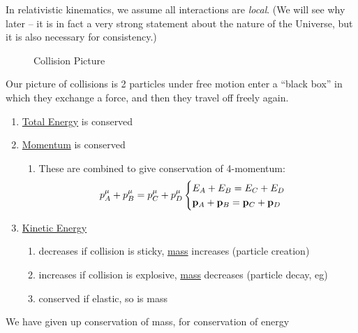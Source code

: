 In relativistic kinematics, we assume all interactions are \emph{local}. (We will see why later -- it is in fact a very strong statement about the nature of the Universe, but it is also necessary for consistency.)

\begin{figure}[H]
  \centering
  \caption{Collision Picture}
\end{figure}

Our picture of collisions is 2 particles under free motion enter a ``black box'' in which they exchange a force, and then they travel off freely again.

\begin{enumerate}
\item \underline{Total Energy} is conserved
\item \underline{Momentum} is conserved
  \begin{enumerate}
  \item These are combined to give conservation of 4-momentum:
    \begin{align*}
      p^\mu_A+p^\mu_B=p^\mu_C+p^\mu_D
      \begin{cases}
        E_A+E_B=E_C+E_D\\
        \vb{p}_A+\vb{p}_B=\vb{p}_C+\vb{p}_D
      \end{cases}
    \end{align*}
  \end{enumerate}
\item \underline{Kinetic Energy}
    \begin{enumerate}[label=\alph*)]
  \item decreases if collision is sticky, \underline{mass} increases (particle creation)
  \item increases if collision is explosive, \underline{mass} decreases (particle decay, eg)
  \item conserved if elastic, so is mass
  \end{enumerate}
\end{enumerate}
We have given up conservation of mass, for conservation of energy

